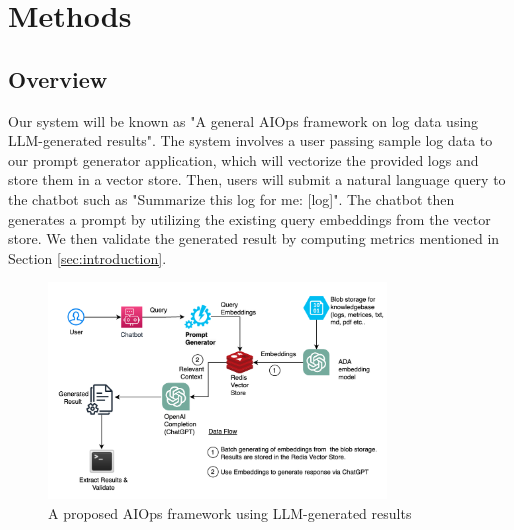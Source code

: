 \documentclass[conference]{IEEEtran}
\begin{document}


\section{Methods}

\subsection{Overview}

Our system will be known as "A general AIOps framework on log data using LLM-generated results". The system involves a user passing sample log data to our prompt generator application, which will vectorize the provided logs and store them in a vector store. Then, users will submit a natural language query to the chatbot such as "Summarize this log for me: [log]". The chatbot then generates a prompt by utilizing the existing query embeddings from the vector store. We then validate the generated result by computing metrics mentioned in Section \ref{sec:introduction}.

\begin{figure}[ht]
    \centering
    \includegraphics[width=0.8\textwidth]{arch.png}
    \caption{A proposed AIOps framework using LLM-generated results}
    \label{fig:arch}
\end{figure}
\end{document}

